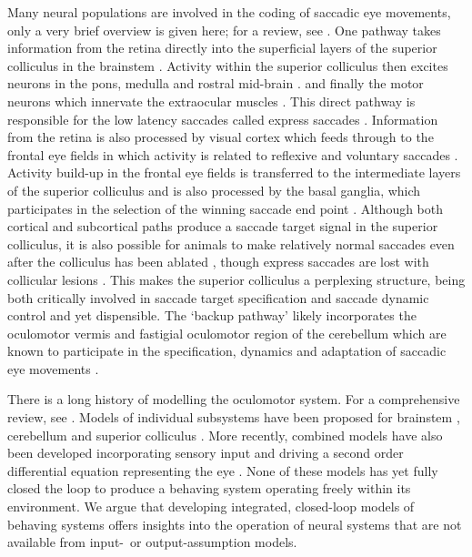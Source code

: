 \documentclass{frontiersSCNS}
\begin{document}
Many neural populations are involved in the coding of saccadic eye
movements, only a very brief overview is given here; for a review,
see \cite{munoz_commentary:_2002}. One pathway takes information from
the retina directly into the superficial layers of the superior
colliculus in the brainstem
\citep{sterling_receptive_1971,linden_massive_1983,wu_involvement_1994}.
Activity within the superior colliculus then excites neurons in the
pons, medulla and rostral mid-brain \citep{sparks_brainstem_2002}.
and finally the motor neurons which innervate the extraocular muscles
\citep{fuchs_firing_1970,sparks_brainstem_2002}. This direct pathway
is responsible for the low latency saccades called express saccades
\citep{schiller_effect_1987,edelman_activity_1996}.
%
Information from the retina is also processed by visual cortex which
feeds through to the frontal eye fields in which activity is related
to reflexive and voluntary
saccades \citep{schall_neural_1999}. Activity build-up in the frontal
eye fields is transferred to the intermediate layers of the superior
colliculus
\citep{stanton_frontal_1988-1} and is also processed by the basal ganglia,
which participates in the selection of the winning saccade end point
\citep{stanton_frontal_1988}.
%
Although both cortical and subcortical paths produce a saccade target
signal in the superior colliculus, it is also possible for animals to
make relatively normal saccades even after the colliculus has been
ablated
\citep{wurtz_activity_1972,aizawa_reversible_1998},
though express saccades are lost with collicular lesions
\citep{schiller_effect_1987}. This makes the superior colliculus
a perplexing structure, being both critically involved in saccade
target specification \citep{sparks_sensory_1987} and saccade dynamic control
\citep{waitzman_superior_1991,goossens_optimal_2012} and yet dispensible.
The `backup pathway' likely incorporates the oculomotor vermis and
fastigial oculomotor region of the cerebellum which are known to
participate in the specification, dynamics and adaptation of saccadic
eye movements \citep{kleine_saccade-related_2003,takagi_effects_1998}.

There is a long history of modelling the oculomotor system. For a
comprehensive review, see \cite{girard_brainstem_2005}. Models of
individual subsystems have been proposed for brainstem
\citep{robinson_oculomotor_1975,scudder_new_1988,gancarz_neural_1998},
cerebellum \citep{quaia_model_1999,dean_modelling_1995,dean_learning_1994}
and superior colliculus
\citep{arai_two-dimensional_1994,moren_mechanism_2013,marino_spatial_2012}.
More recently, combined models have also been developed incorporating
sensory input \citep{cope_basal_2017} and driving a second order
differential equation representing the eye
\citep{tabareau_geometry_2007,nguyen_saccade_2014,thurat_biomimetic_2015}.
None of these models has yet fully closed the loop to produce a
behaving system operating freely within its environment. We argue that
developing integrated, closed-loop models of behaving systems offers
insights into the operation of neural systems that are not available
from input-~or output-assumption models.
\end{document}
